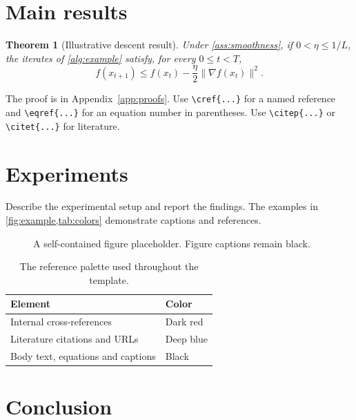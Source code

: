\documentclass[10pt,a4paper]{article}
\newtheorem{theorem}{Theorem}[section]
\theoremstyle{definition}
\theoremstyle{remark}
\begin{document}
\section{Main results}

\begin{theorem}[Illustrative descent result]
\label{thm:descent}
Under \cref{ass:smoothness}, if $0<\eta\le1/L$, the iterates of
\cref{alg:example} satisfy, for every $0\le t<T$,
\begin{equation}
 f(x_{t+1})\le f(x_t)-\frac{\eta}{2}\|\nabla f(x_t)\|^2.
 \label{eq:descent}
\end{equation}
\end{theorem}

The proof is in Appendix~\ref{app:proofs}. Use \verb|\cref{...}| for a
named reference and \verb|\eqref{...}| for an equation number in
parentheses. Use \verb|\citep{...}| or \verb|\citet{...}| for literature.

\section{Experiments}

Describe the experimental setup and report the findings. The examples
in \cref{fig:example,tab:colors} demonstrate captions and references.

\begin{figure}[htbp]
\centering
{}
\caption{A self-contained figure placeholder. Figure captions remain black.}
\label{fig:example}
\end{figure}

\begin{table}[htbp]
\centering
\caption{The reference palette used throughout the template.}
\label{tab:colors}
\begin{tabular}{ll}
\toprule
Element & Color\\
\midrule
Internal cross-references & \textcolor{CrossReferenceRed}{Dark red}\\
Literature citations and URLs & \textcolor{ReferenceBlue}{Deep blue}\\
Body text, equations and captions & Black\\
\bottomrule
\end{tabular}
\end{table}

\section{Conclusion}
\end{document}
